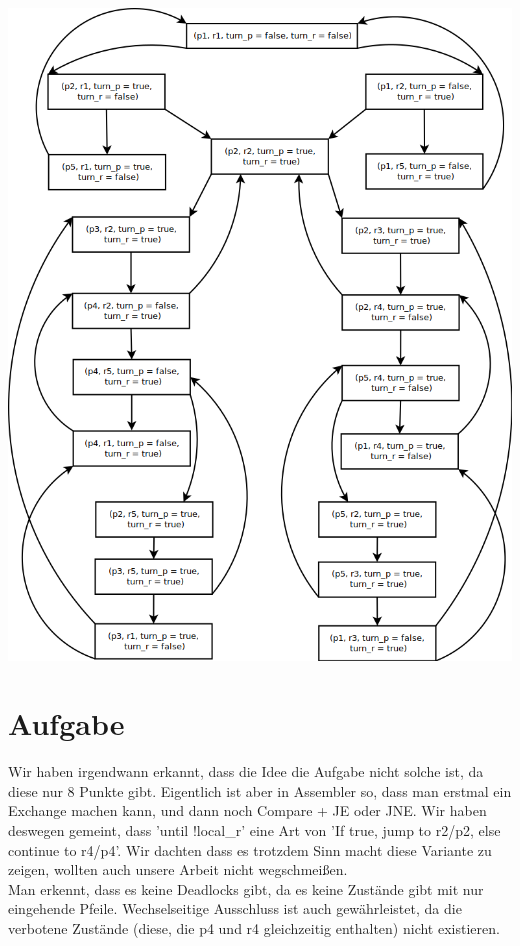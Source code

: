 \includegraphics[width=\textwidth]{./exercise1/diagramm-1-B.png}

\section{Aufgabe}

Wir haben irgendwann erkannt, dass die Idee die Aufgabe nicht solche ist, da diese nur 8 Punkte gibt. Eigentlich ist aber in Assembler so, dass man erstmal ein Exchange machen kann, und dann noch Compare + JE oder JNE. Wir haben deswegen gemeint, dass 'until !local\_r' eine Art von 'If true, jump to r2/p2, else continue to r4/p4'. Wir dachten dass es trotzdem Sinn macht diese Variante zu zeigen, wollten auch unsere Arbeit nicht wegschmeißen. \\

Man erkennt, dass es keine Deadlocks gibt, da es keine Zustände gibt mit nur eingehende Pfeile. 
Wechselseitige Ausschluss ist auch gewährleistet, da die verbotene Zustände (diese, die p4 und r4 gleichzeitig enthalten) nicht existieren.

